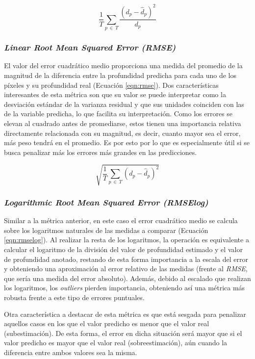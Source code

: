 \documentclass[a4paper]{article}
\begin{document}
\begin{equation}
\label{eqn:sq_rel}
\frac{1}{T}\sum_{p\ \in\ T} \frac{(d_p - \hat{d}_p)^2}{d_p}
\end{equation}

\subsubsection{\textit{Linear Root Mean Squared Error (RMSE)}}
El valor del error cuadrático medio proporciona una medida del promedio de la magnitud de la diferencia entre la profundidad predicha para cada uno de los píxeles y su profundidad real (Ecuación \ref{eqn:rmse}). Dos características interesantes de esta métrica son que su valor se puede interpretar  como la desviación estándar de la varianza residual y que sus unidades coinciden con las de la variable predicha, lo que facilita su interpretación. Como los errores se elevan al cuadrado antes de promediarse, estos tienen una importancia relativa directamente relacionada con su magnitud, es decir, cuanto mayor sea el error, más peso tendrá en el promedio. Es por esto por lo que es especialmente útil si se busca penalizar más los errores más grandes en las predicciones.

\begin{equation}
\label{eqn:rmse}
\sqrt{\frac{1}{T}\sum_{p\ \in\ T} (d_p - \hat{d}_p)^2}
\end{equation}

\subsubsection{\textit{Logarithmic Root Mean Squared Error (RMSElog)}}
Similar a la métrica anterior, en este caso el error cuadrático medio se calcula sobre los logaritmos naturales de las medidas a comparar (Ecuación \ref{eqn:rmselog}). Al realizar la resta de los logaritmos, la operación es equivalente a calcular el logaritmo de la división del valor de profundidad estimado y el valor de profundidad anotado, restando de esta forma importancia a la escala del error y obteniendo una aproximación al error relativo de las medidas (frente al \textit{RMSE}, que sería una medida del error absoluto). Además, debido al escalado que realizan los logaritmos, los \textit{outliers} pierden importancia, obteniendo así una métrica más robusta frente a este tipo de errores puntuales.

Otra característica a destacar de esta métrica es que está sesgada para penalizar aquellos casos en los que el valor predicho es menor que el valor real (subestimación). De esta forma, el error en dicha situación será mayor que si el valor predicho es mayor que el valor real (sobreestimación), aún cuando la diferencia entre ambos valores sea la misma.
\end{document}

